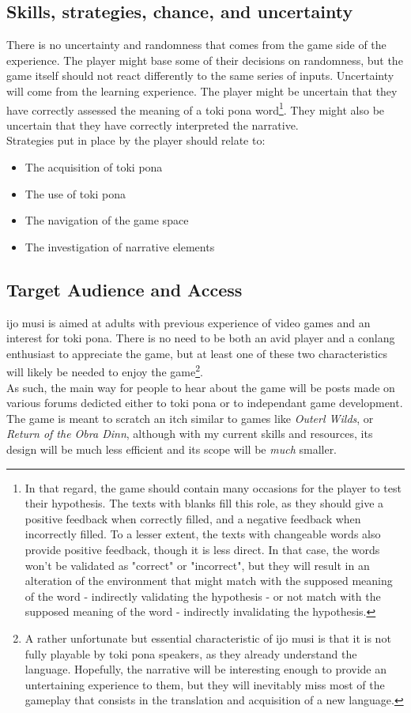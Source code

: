 \documentclass{scrartcl}
\begin{document}
		\subsection{Skills, strategies, chance, and uncertainty}
			There is no uncertainty and randomness that comes from the game side of the experience. The player might base some of their decisions on randomness, but the game itself should not react differently to the same series of inputs. Uncertainty will come from the learning experience. The player might be uncertain that they have correctly assessed the meaning of a toki pona word\footnote{In that regard, the game should contain many occasions for the player to test their hypothesis. The texts with blanks  fill this role, as they should give a positive feedback when correctly filled, and a negative feedback when incorrectly filled. To a lesser extent, the texts with changeable words also provide positive feedback, though it is less direct. In that case, the words won't be validated as "correct" or "incorrect", but they will result in an alteration of the environment that might match with the supposed meaning of the word - indirectly validating the hypothesis - or not match with the supposed meaning of the word - indirectly invalidating the hypothesis.}. They might also be uncertain that they have correctly interpreted the narrative. \\ 
		Strategies put in place by the player should relate to:
		\begin{itemize}
			\item The acquisition of toki pona
			\item The use of toki pona
			\item The navigation of the game space
			\item The investigation of narrative elements
		\end{itemize}
		\subsection{Target Audience and Access}
			ijo musi is aimed at adults with previous experience of video games and an interest for toki pona. There is no need to be both an avid player and a conlang enthusiast to appreciate the game, but at least one of these two characteristics will likely be needed to enjoy the game\footnote{A rather unfortunate but essential characteristic of ijo musi is that it is not fully playable by toki pona speakers, as they already understand the language. Hopefully, the narrative will be interesting enough to provide an untertaining experience to them, but they will inevitably miss most of the gameplay that consists in the translation and acquisition of a new language.}.\\
			As such, the main way for people to hear about the game will be posts made on various forums dedicted either to toki pona or to independant game development.\\
			The game is meant to scratch an itch similar to games like \textit{Outerl Wilds}, or \textit{Return of the Obra Dinn}, although with my current skills and resources, its design will be much less efficient and its scope will be \textit{much} smaller.
\end{document}
